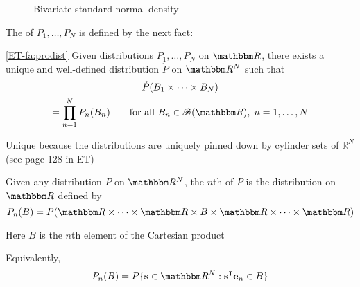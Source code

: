 \begin{frame}

    \vspace{2em}
    \begin{figure}
    
   \centering
   \caption{\label{f:bivar_gaussian_3d} Bivariate standard normal density}
   
    \end{figure}
    
\end{frame}
    
\begin{frame}
    
     \vspace{2em}
    The  of $P_1, \ldots,
    P_N$ is defined by the next fact:
    
     \vspace{1em}
    \Fact\eqref{ET-fa:prodist}
    Given distributions $P_1, \ldots, P_N$ on $\RR$, there exists a unique
    and well-defined distribution $\mathring{P}$ on $\RR^N$ such that
    \begin{multline*}
        \mathring{P}(B_1 \times \cdots \times B_N)
        \\ = \prod_{n=1}^N P_n(B_n)
        \qquad \text{for all } B_n \in \bB(\RR), \; n=1,\ldots, N       
    \end{multline*}
    
    \vspace{1em}
    Unique because the distributions are uniquely pinned down by cylinder sets 
    of $\mathbb{R}^{N}$ (see page 128 in ET)
    
\end{frame}

\begin{frame}
    
    \vspace{2em}
    Given any distribution $P$ on $\RR^N$, the $n$th  of $P$ is the distribution on $\RR$ defined by 
    \begin{equation*}
        P_n(B)
        = P (\RR \times \cdots \times \RR \times B \times \RR \times \cdots
        \times \RR)
    \end{equation*}
    
    \vspace{.7em}
    Here $B$ is the $n$th element of the Cartesian product
    
    \vspace{.7em}
    Equivalently, 
    \begin{equation*}
    P_n(B) 
    = P \setntn{\bolds \in \RR^N}{\bolds^\T \bolde_n \in B}
    \end{equation*}
    
\end{frame}

